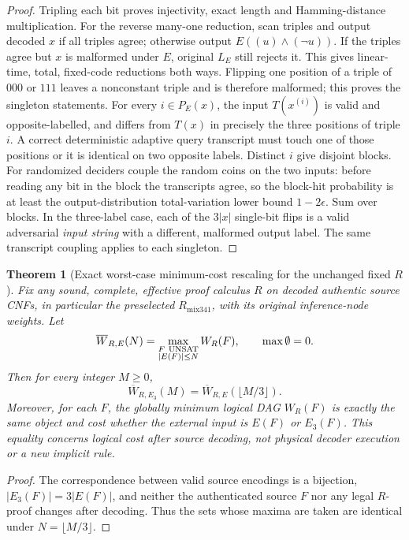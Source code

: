 \documentclass[11pt]{article}
\newtheorem{theorem}{Theorem}
\begin{document}
\begin{proof}
Tripling each bit proves injectivity, exact length and Hamming-distance multiplication. For the reverse many-one reduction, scan triples and output decoded \(x\) if all triples agree; otherwise output \(E((u)\land(\neg u))\). If the triples agree but \(x\) is malformed under \(E\), original \(L_E\) still rejects it. This gives linear-time, total, fixed-code reductions both ways. Flipping one position of a triple of \(000\) or \(111\) leaves a nonconstant triple and is therefore malformed; this proves the singleton statements. For every \(i\in P_E(x)\), the input \(T(x^{(i)})\) is valid and opposite-labelled, and differs from \(T(x)\) in precisely the three positions of triple \(i\). A correct deterministic adaptive query transcript must touch one of those positions or it is identical on two opposite labels. Distinct \(i\) give disjoint blocks. For randomized deciders couple the random coins on the two inputs: before reading any bit in the block the transcripts agree, so the block-hit probability is at least the output-distribution total-variation lower bound \(1-2\epsilon\). Sum over blocks. In the three-label case, each of the \(3|x|\) single-bit flips is a valid adversarial \emph{input string} with a different, malformed output label. The same transcript coupling applies to each singleton.
\end{proof}

\begin{theorem}[Exact worst-case minimum-cost rescaling for the unchanged fixed \(R\)]
Fix any sound, complete, effective proof calculus \(R\) on \emph{decoded authentic source CNFs}, in particular the preselected \(R_{\mathrm{mix341}}\), with its original inference-node weights. Let
\[
\overline W_{R,E}(N)=\max_{\substack{F\ {\rm UNSAT}\\|E(F)|\le N}} W_R(F),\qquad \max\emptyset=0.
\]
Then for every integer \(M\ge0\),
\[
\boxed{\overline W_{R,E_3}(M)=\overline W_{R,E}(\lfloor M/3\rfloor).}
\]
Moreover, for each \(F\), the globally minimum logical DAG \(W_R(F)\) is \emph{exactly the same object and cost} whether the external input is \(E(F)\) or \(E_3(F)\). This equality concerns logical cost after source decoding, not physical decoder execution or a new implicit rule.
\end{theorem}
\begin{proof}
The correspondence between valid source encodings is a bijection, \(|E_3(F)|=3|E(F)|\), and neither the authenticated source \(F\) nor any legal \(R\)-proof changes after decoding. Thus the sets whose maxima are taken are identical under \(N=\lfloor M/3\rfloor\).
\end{proof}
\end{document}
